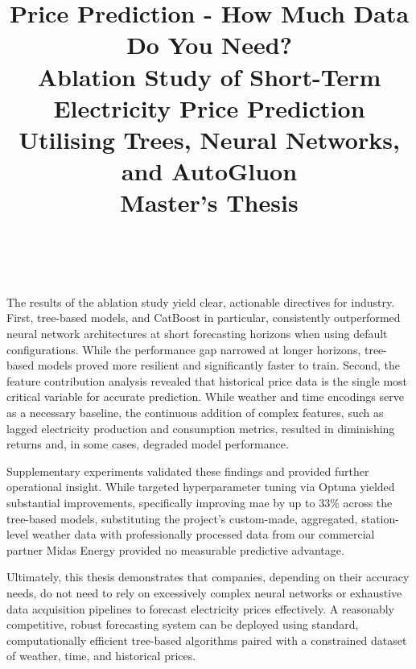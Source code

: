 \documentclass[conference]{IEEEtran}
\begin{document}
The results of the ablation study yield clear, actionable directives for 
industry. First, tree-based models, and CatBoost in particular, consistently 
outperformed neural network architectures at short forecasting horizons when 
using default configurations. While the performance gap narrowed at longer 
horizons, tree-based models proved more resilient and significantly faster to
train. Second, the feature contribution analysis revealed that historical price 
data is the single most critical variable for accurate prediction. While 
weather and time encodings serve as a necessary baseline, the continuous 
addition of complex features, such as lagged electricity production and 
consumption metrics, resulted in  diminishing returns and, in some cases, 
degraded model performance.

Supplementary experiments validated these findings and provided further 
operational insight. While targeted hyperparameter tuning via Optuna yielded 
substantial improvements, specifically improving \gls{mae} by up to 33\% across 
the tree-based models, substituting the project’s custom-made, aggregated, 
station-level weather data with professionally processed data from our 
commercial partner Midas Energy provided no measurable predictive advantage. 

Ultimately, this thesis demonstrates that companies, depending on their 
accuracy needs, do not need to rely on excessively complex neural networks or 
exhaustive data acquisition pipelines to forecast electricity prices 
effectively. A reasonably competitive, robust forecasting system can be 
deployed using standard, computationally efficient tree-based algorithms paired
with a constrained dataset of weather, time, and historical prices.
\twocolumn
{}

\title{Price Prediction - How Much Data Do You 
Need?\\ 
{\Large Ablation Study of Short-Term Electricity 
Price Prediction\\ Utilising Trees, Neural 
Networks, 
and AutoGluon \\}
{\footnotesize Master's Thesis}}


\author{%
    \\
    	}
\end{document}
